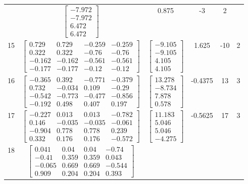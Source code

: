 \documentclass[a4paper,12pt]{article}
\begin{document}
\begin{tabular}{c c c c c c}
&
$\begin{bmatrix} -7.972 \\ -7.972 \\ 6.472 \\ 6.472 \end{bmatrix}$
&
0.875
&
-3
&
2
\\
15
&
$\begin{bmatrix} 0.729 & 0.729 & -0.259 & -0.259 \\ 0.322 & 0.322 & -0.76 & -0.76 \\ -0.162 & -0.162 & -0.561 & -0.561 \\ -0.177 & -0.177 & -0.12 & -0.12 \end{bmatrix}$
&
$\begin{bmatrix} -9.105 \\ -9.105 \\ 4.105 \\ 4.105 \end{bmatrix}$
&
1.625
&
-10
&
2
\\
16
&
$\begin{bmatrix} -0.365 & 0.392 & -0.771 & -0.379 \\ 0.732 & -0.034 & 0.109 & -0.29 \\ -0.542 & -0.773 & -0.477 & -0.856 \\ -0.192 & 0.498 & 0.407 & 0.197 \end{bmatrix}$
&
$\begin{bmatrix} 13.278 \\ -8.734 \\ 7.878 \\ 0.578 \end{bmatrix}$
&
-0.4375
&
13
&
3
\\
17
&
$\begin{bmatrix} -0.227 & 0.013 & 0.013 & -0.782 \\ 0.146 & -0.035 & -0.035 & -0.061 \\ -0.904 & 0.778 & 0.778 & 0.239 \\ 0.332 & 0.176 & 0.176 & -0.572 \end{bmatrix}$
&
$\begin{bmatrix} 11.183 \\ 5.046 \\ 5.046 \\ -4.275 \end{bmatrix}$
&
-0.5625
&
17
&
3
\\
18
&
$\begin{bmatrix} 0.041 & 0.04 & 0.04 & -0.74 \\ -0.41 & 0.359 & 0.359 & 0.043 \\ -0.065 & 0.669 & 0.669 & -0.544 \\ 0.909 & 0.204 & 0.204 & 0.393 \end{bmatrix}$

\end{tabular}
\end{document}
